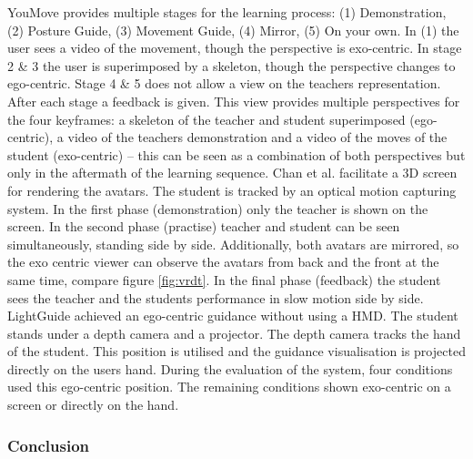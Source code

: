 YouMove \cite{Anderson2013} provides multiple stages for the learning process: (1) Demonstration, (2) Posture Guide, (3) Movement Guide, (4) Mirror, (5) On your own. In (1) the user sees a video of the movement, though the perspective is exo-centric. In stage 2 \& 3 the user is superimposed by a skeleton, though the perspective changes to ego-centric. Stage 4 \& 5 does not allow a view on the teachers representation. After each stage a feedback is given. This view provides multiple perspectives for the four keyframes: a skeleton of the teacher and student superimposed (ego-centric), a video of the teachers demonstration and a video of the moves of the student (exo-centric) \--- this can be seen as a combination of both perspectives but only in the aftermath of the learning sequence.
Chan et al. \cite{Chan2011} facilitate a 3D screen for rendering the avatars. The student is tracked by an optical motion capturing system. In the first phase (demonstration) only the teacher is shown on the screen. In the second phase (practise) teacher and student can be seen simultaneously, standing side by side. Additionally, both avatars are mirrored, so the exo centric viewer can observe the avatars from back and the front at the same time, compare figure \ref{fig:vrdt}. In the final phase (feedback) the student sees the teacher and the students performance in slow motion side by side.
LightGuide \cite{Sodhi2012} achieved an ego-centric guidance without using a HMD. The student stands under a depth camera and a projector. The depth camera tracks the hand of the student. This position is utilised and the guidance visualisation is projected directly on the users hand. During the evaluation of the system, four conditions used this ego-centric position. The remaining conditions shown exo-centric on a screen or directly on the hand.
\subsubsection{Conclusion}

